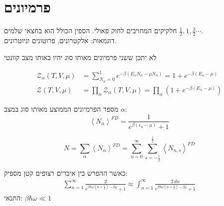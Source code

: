 \section{פרמיונים}


חלקיקים המחויבים לחוק פאולי. הספין הכולל הוא בחצאי שלמים $\tfrac{1}{2},1,\tfrac{3}{2}\cdots$. \\
דוגמאות: אלקטרונים, פרוטונים וניוטרונים.

\begin{cheatformula}
לא יתכן ששני פרמיונים מאותו סוג יהיו באותו מצב קוונטי
\end{cheatformula}



\begin{cheatformula}
    \begin{align*}
    \mathcal{Z}_\alpha \left(T,V,\mu\right) &= \sum_{N_\alpha = 0}^1 e^{-\beta \left( E_\alpha N_\alpha - \mu N_\alpha \right)} = 1 + e^{-\beta \left( E_\alpha - \mu \right)} \\
    \mathcal{Z} \left(T,V,\mu\right) &= \prod_\alpha \mathcal{Z}_\alpha \left(T,V,\mu\right) = \prod_\alpha \left( 1 + e^{-\beta \left( E_\alpha - \mu \right)} \right)
    \end{align*}
\end{cheatformula}

\begin{cheatformula}
מספר הפרמיונים הממוצע מאותו סוג במצב $\alpha$:
    $$\left<N_\alpha \right>^{FD} = \frac{1}{e^{\beta \left(\epsilon_\alpha -\mu \right) }+1}$$
\end{cheatformula}

\begin{cheatformula}
$$N = \sum_\alpha \left< N_\alpha \right>^{FD} = \sum_{n=0}^{\infty} \sum_{s=-\frac{1}{2}}^{\frac{1}{2}} \left< N_{n,s} \right>^{FD}$$
\end{cheatformula}



\begin{cheatformula}
כאשר ההפרש בין איברים רצופים קטן מספיק:
\begin{align*}
\sum_{n=1}^\infty \frac{2}{e^{\beta \hbar \omega \left(n+\frac{1}{2} \right) - \beta \mu}+1} \approx \int_{n=1}^\infty \frac{2 \, dn}{e^{\beta \hbar \omega \left(n+\frac{1}{2} \right) - \beta \mu}+1}
\end{align*}
התנאי: $\beta \hbar \omega \ll 1$
\end{cheatformula}

